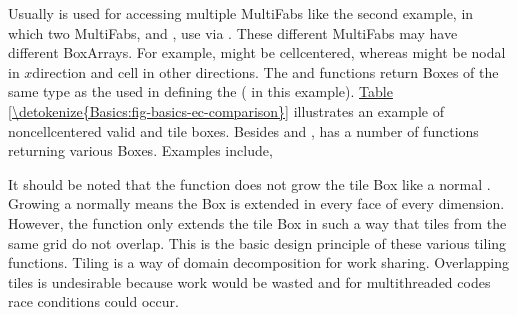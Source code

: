 \documentclass[letterpaper,10pt,english]{sphinxmanual}
\begin{document}
\sphinxAtStartPar
Usually  is used for accessing multiple MultiFabs like the second
example, in which two MultiFabs,  and , use  via
. These different MultiFabs may have different BoxArrays. For
example,  might be cell\sphinxhyphen{}centered, whereas  might be nodal in
\(x\)\sphinxhyphen{}direction and cell in other directions. The 
and  functions return Boxes of the same type as the
 used in defining the  ( in this example).
\hyperref[\detokenize{Basics:fig-basics-ec-comparison}]{Table \ref{\detokenize{Basics:fig-basics-ec-comparison}}} illustrates an example of non\sphinxhyphen{}cell\sphinxhyphen{}centered
valid and tile boxes. Besides  and , 
has a number of functions returning various Boxes.  Examples include,

\begin{sphinxVerbatim}[commandchars=\\\{\}]
         

   

   
\end{sphinxVerbatim}

\sphinxAtStartPar
It should be noted that the function  does not grow the tile
Box like a normal . Growing a  normally means the Box is
extended in every face of every dimension.  However, the function
 only extends the tile Box in such a way that tiles from the
same grid do not overlap. This is the basic design principle of these various
tiling functions. Tiling is a way of domain decomposition for work sharing.
Overlapping tiles is undesirable because work would be wasted and for
multi\sphinxhyphen{}threaded codes race conditions could occur.
\end{document}
